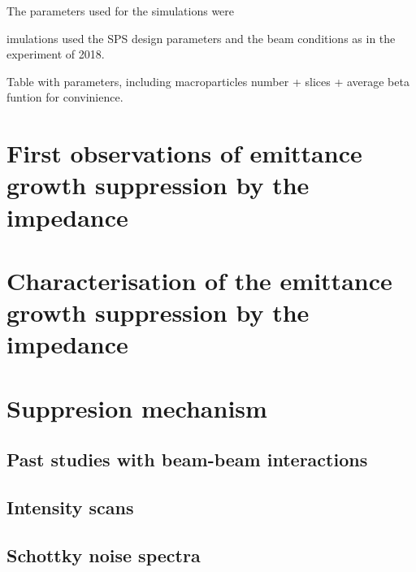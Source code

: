 The parameters used for the simulations were

imulations used the SPS design parameters and the beam conditions as in the experiment of 2018.

Table with parameters, including macroparticles number + slices + average beta funtion for convinience.




\section{First observations of emittance growth suppression by the impedance}


\section{Characterisation of the emittance growth suppression by the impedance}

\section{Suppresion mechanism}\label{sec:suppression_mechanism}
\subsection{Past studies with beam-beam interactions}\label{subsec:past_studies_impedance_suppression_BB}
\subsection{Intensity scans}
\subsection{Schottky noise spectra}

